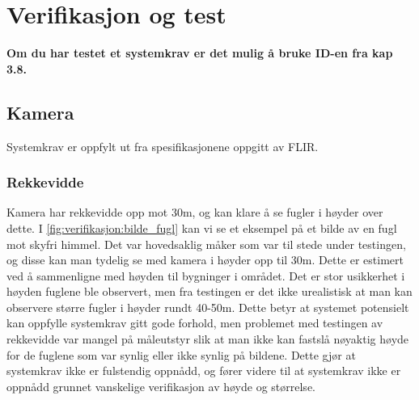 \section{Verifikasjon og test} 
\label{sec:verifikasjon}

\textbf{Om du har testet et systemkrav er det mulig å bruke ID-en fra kap 3.8.} 


\subsection{Kamera}\label{sec:verifikasjon:kamera}

Systemkrav  er oppfylt ut fra spesifikasjonene oppgitt av FLIR. 


\subsubsection{Rekkevidde}\label{sec:verifikasjon:rekkevidde}
Kamera har rekkevidde opp mot 30m, og kan klare å se fugler i høyder over dette. 
I \autoref{fig:verifikasjon:bilde_fugl} kan vi se et eksempel på et bilde av en fugl mot skyfri himmel. 
Det var hovedsaklig måker som var til stede under testingen, og disse kan man tydelig se med kamera i høyder opp til 30m. 
Dette er estimert ved å sammenligne med høyden til bygninger i området. 
Det er stor usikkerhet i høyden fuglene ble observert, men fra testingen er det ikke urealistisk at man kan observere større fugler i høyder rundt 40-50m. 
Dette betyr at systemet potensielt kan oppfylle systemkrav  gitt gode forhold, men problemet med testingen av rekkevidde var mangel på måleutstyr slik at man ikke kan fastslå nøyaktig høyde for de fuglene som var synlig eller ikke synlig på bildene.
Dette gjør at systemkrav  ikke er fulstendig oppnådd, og fører videre til at systemkrav  ikke er oppnådd grunnet vanskelige verifikasjon av høyde og størrelse.


